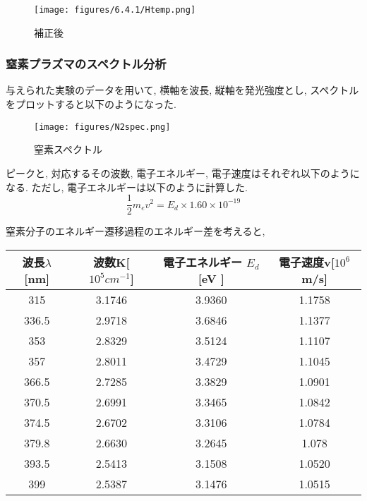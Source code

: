 \documentclass{ltjsarticle}
\begin{document}
\begin{figure}[H]
    \begin{center}
        \texttt{[image: figures/6.4.1/Htemp.png]}
        \caption{補正後}
    \end{center}
\end{figure}


\subsubsection{窒素プラズマのスペクトル分析}
与えられた実験のデータを用いて, 横軸を波長, 縦軸を発光強度とし, スペクトルをプロットすると以下のようになった. 

\begin{figure}[H]
    \begin{center}
        \texttt{[image: figures/N2spec.png]}
        \caption{窒素スペクトル}
    \end{center}
\end{figure}

ピークと, 対応するその波数, 電子エネルギー, 電子速度はそれぞれ以下のようになる. ただし, 電子エネルギーは以下のように計算した. \\

\[
    \frac{1}{2}m_ev^2 = E_d \times 1.60 \times 10^{-19}
\]

窒素分子のエネルギー遷移過程のエネルギー差を考えると, 
\begin{table}[H]
    \begin{center}
        \begin{tabular}{|c|c|c|c|} \hline
            波長$\lambda$ [nm] & 波数K[$10^5cm^{-1}$] & 電子エネルギー $E_d$[eV
            ] & 電子速度v[$10^6$m/s]\\ \hline
            315 & 3.1746 & 3.9360 & 1.1758\\ \hline
            336.5 & 2.9718 & 3.6846 & 1.1377 \\ \hline
            353 & 2.8329 & 3.5124 & 1.1107 \\ \hline
            357 & 2.8011 & 3.4729 & 1.1045 \\ \hline
            366.5 & 2.7285 & 3.3829 & 1.0901  \\ \hline
            370.5 & 2.6991 & 3.3465  & 1.0842 \\ \hline
            374.5 & 2.6702 & 3.3106 & 1.0784 \\ \hline
            379.8 & 2.6630 & 3.2645 & 1.078 \\ \hline
            393.5 & 2.5413 & 3.1508 & 1.0520 \\ \hline
            399 & 2.5387 & 3.1476 & 1.0515 \\ \hline
        \end{tabular}
    \end{center}
\end{table}
\end{document}
